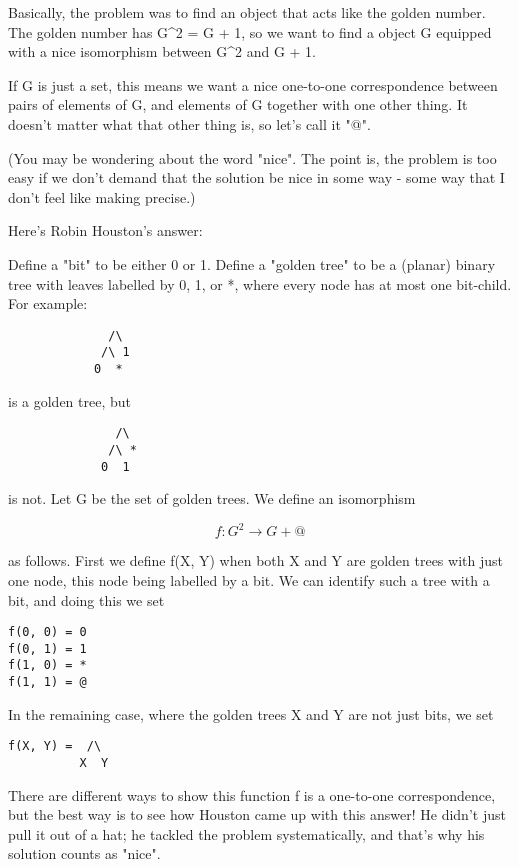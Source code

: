 Basically, the problem was to find an object that acts like the golden 
number.  The golden number has 
G^{2} = G + 1, so we want to find
a object G equipped with a nice isomorphism between G^{2} and
G + 1.

If G is just a set, this means we want a nice one-to-one correspondence between 
pairs of elements of G, and elements of G together with one other thing.
It doesn't matter what that other thing is, so let's call it "@".

(You may be wondering about the word "nice".  The point is, the 
problem
is too easy if we don't demand that the solution be nice in some way -
some way that I don't feel like making precise.)

Here's Robin Houston's answer:

Define a "bit" to be either 0 or 1.  Define a "golden tree" to be a 
(planar) binary tree with leaves labelled by 0, 1, or *, where every 
node has at most one bit-child.  For example:

\begin{verbatim}
              /\   
             /\ 1 
            0  * 
\end{verbatim}
    
is a golden tree, but
\begin{verbatim}
               /\   
              /\ *
             0  1
\end{verbatim}
    
is not.
Let G be the set of golden trees.  We define an isomorphism 

$$
f: G^{2} \to  G + {@} 
$$
    
as follows.  First we define f(X, Y) when both X and Y are golden
trees with just one node, this node being labelled by a bit.  We 
can identify such a tree with a bit, and doing this we set

\begin{verbatim}
f(0, 0) = 0
f(0, 1) = 1
f(1, 0) = *
f(1, 1) = @
\end{verbatim}
    
In the remaining case, where the golden trees X and Y are not just bits,
we set

\begin{verbatim}
f(X, Y) =  /\ 
          X  Y
\end{verbatim}
    
There are different ways to show this function f is a one-to-one correspondence,
but the best way is to see how Houston came up with this answer!  He 
didn't just pull it out of a hat; he tackled the problem 
systematically, and that's
why his solution counts as "nice".

